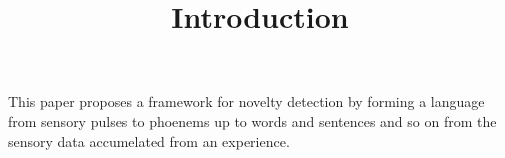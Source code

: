 \documentclass[a4paper]{article}
\title{Introduction}
\date{}
\begin{document}
    \maketitle
    
    This paper proposes a framework for novelty detection by forming a language from sensory pulses to phoenems up to words and sentences and so on from the sensory data accumelated from an experience.
    
    


%    
%    
\end{document}
